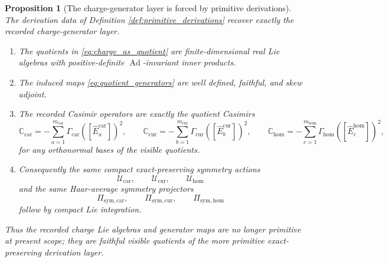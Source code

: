 \documentclass[11pt]{article}
\newcommand{\TensorSymProj}{\Pi_{\mathrm{sym,car}}}
\newcommand{\CurSymProj}{\Pi_{\mathrm{sym,cur}}}
\newcommand{\HomSymProj}{\Pi_{\mathrm{sym,hom}}}
\newcommand{\TensorSymAct}{\mathscr U_{\mathrm{car}}}
\newcommand{\CurSymAct}{\mathscr U_{\mathrm{cur}}}
\newcommand{\HomSymAct}{\mathscr U_{\mathrm{hom}}}
\newcommand{\TensorGen}{\Gamma_{\mathrm{car}}}
\newcommand{\CurGen}{\Gamma_{\mathrm{cur}}}
\newcommand{\HomGen}{\Gamma_{\mathrm{hom}}}
\newcommand{\TensorCasimir}{\mathbb C_{\mathrm{car}}}
\newcommand{\CurCasimir}{\mathbb C_{\mathrm{cur}}}
\newcommand{\HomCasimir}{\mathbb C_{\mathrm{hom}}}
\newtheorem{proposition}{Proposition}
\begin{document}
\begin{proposition}[The charge-generator layer is forced by primitive derivations]
\label{prop:charge_from_derivations}
The derivation data of Definition \ref{def:primitive_derivations} recover exactly the recorded charge-generator layer.
\begin{enumerate}
    \item The quotients in \eqref{eq:charge_as_quotient} are finite-dimensional real Lie algebras with positive-definite \(\operatorname{Ad}\)-invariant inner products.
    \item The induced maps \eqref{eq:quotient_generators} are well defined, faithful, and skew adjoint.
    \item The recorded Casimir operators are exactly the quotient Casimirs
    \begin{equation}
    \TensorCasimir
    =
    -\sum_{a=1}^{m_{\mathrm{car}}}\TensorGen([\widehat E_a^{\mathrm{car}}])^2,
    \qquad
    \CurCasimir
    =
    -\sum_{b=1}^{m_{\mathrm{cur}}}\CurGen([\widehat E_b^{\mathrm{cur}}])^2,
    \qquad
    \HomCasimir
    =
    -\sum_{c=1}^{m_{\mathrm{hom}}}\HomGen([\widehat E_c^{\mathrm{hom}}])^2,
    \label{eq:casimir_from_derivations}
    \end{equation}
    for any orthonormal bases of the visible quotients.
    \item Consequently the same compact exact-preserving symmetry actions
    \[
    \TensorSymAct,\qquad
    \CurSymAct,\qquad
    \HomSymAct
    \]
    and the same Haar-average symmetry projectors
    \[
    \TensorSymProj,\qquad
    \CurSymProj,\qquad
    \HomSymProj
    \]
    follow by compact Lie integration.
\end{enumerate}
Thus the recorded charge Lie algebras and generator maps are no longer primitive at present scope; they are faithful visible quotients of the more primitive exact-preserving derivation layer.
\end{proposition}
\end{document}
